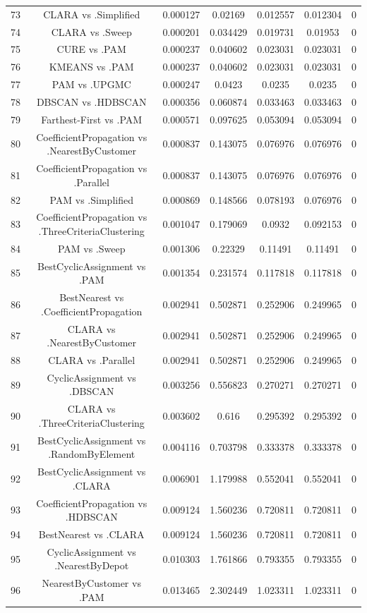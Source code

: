 \documentclass[a4paper,10pt]{article}
\begin{document}
\begin{landscape}
\begin{table}[!htp]
\begin{tabular}{ccccccc}
73&CLARA vs .Simplified&0.000127&0.02169&0.012557&0.012304&0\\
74&CLARA vs .Sweep&0.000201&0.034429&0.019731&0.01953&0\\
75&CURE vs .PAM&0.000237&0.040602&0.023031&0.023031&0\\
76&KMEANS vs .PAM&0.000237&0.040602&0.023031&0.023031&0\\
77&PAM vs .UPGMC&0.000247&0.0423&0.0235&0.0235&0\\
78&DBSCAN vs .HDBSCAN&0.000356&0.060874&0.033463&0.033463&0\\
79&Farthest-First vs .PAM&0.000571&0.097625&0.053094&0.053094&0\\
80&CoefficientPropagation vs .NearestByCustomer&0.000837&0.143075&0.076976&0.076976&0\\
81&CoefficientPropagation vs .Parallel&0.000837&0.143075&0.076976&0.076976&0\\
82&PAM vs .Simplified&0.000869&0.148566&0.078193&0.076976&0\\
83&CoefficientPropagation vs .ThreeCriteriaClustering&0.001047&0.179069&0.0932&0.092153&0\\
84&PAM vs .Sweep&0.001306&0.22329&0.11491&0.11491&0\\
85&BestCyclicAssignment vs .PAM&0.001354&0.231574&0.117818&0.117818&0\\
86&BestNearest vs .CoefficientPropagation&0.002941&0.502871&0.252906&0.249965&0\\
87&CLARA vs .NearestByCustomer&0.002941&0.502871&0.252906&0.249965&0\\
88&CLARA vs .Parallel&0.002941&0.502871&0.252906&0.249965&0\\
89&CyclicAssignment vs .DBSCAN&0.003256&0.556823&0.270271&0.270271&0\\
90&CLARA vs .ThreeCriteriaClustering&0.003602&0.616&0.295392&0.295392&0\\
91&BestCyclicAssignment vs .RandomByElement&0.004116&0.703798&0.333378&0.333378&0\\
92&BestCyclicAssignment vs .CLARA&0.006901&1.179988&0.552041&0.552041&0\\
93&CoefficientPropagation vs .HDBSCAN&0.009124&1.560236&0.720811&0.720811&0\\
94&BestNearest vs .CLARA&0.009124&1.560236&0.720811&0.720811&0\\
95&CyclicAssignment vs .NearestByDepot&0.010303&1.761866&0.793355&0.793355&0\\
96&NearestByCustomer vs .PAM&0.013465&2.302449&1.023311&1.023311&0\\

\end{tabular}
\end{table}
\end{landscape}
\end{document}

